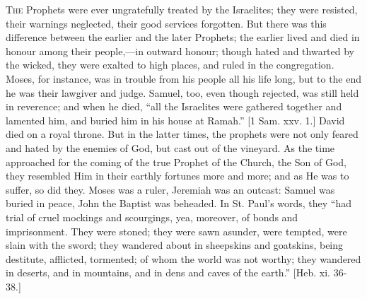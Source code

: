 T\textsc{he} Prophets were ever ungratefully treated by the Israelites; they
were resisted, their warnings neglected, their good services
forgotten. But there was this difference between the earlier and the
later Prophets; the earlier lived and died in honour among their
people,—in outward honour; though hated and thwarted by the wicked,
they were exalted to high places, and ruled in the congregation.
Moses, for instance, was in trouble from his people all his life long,
but to the end he was their lawgiver and judge. Samuel, too, even
though rejected, was still held in reverence; and when he died,
``all the Israelites were gathered together and lamented him, and
buried him in his house at Ramah.'' [1 Sam. xxv. 1.] David died on
a royal throne. But in the latter times, the prophets were not only
feared and hated by the enemies of God, but cast out of the vineyard.
As the time approached for the coming of the true Prophet of the
Church, the Son of God, they resembled Him in their earthly fortunes
more and more; and as He was to suffer, so did they. Moses was a
ruler, Jeremiah was an outcast: Samuel was buried in peace, John the
Baptist was beheaded. In St. Paul's words, they ``had trial of
cruel mockings and scourgings, yea, moreover, of bonds and
imprisonment. They were stoned; they were sawn asunder, were tempted,
were slain with the sword; they wandered about in sheepskins and
goatskins, being destitute, afflicted, tormented; of whom the world
was not worthy; they wandered in deserts, and in mountains, and in
dens and caves of the earth.'' [Heb. xi. 36-38.]

